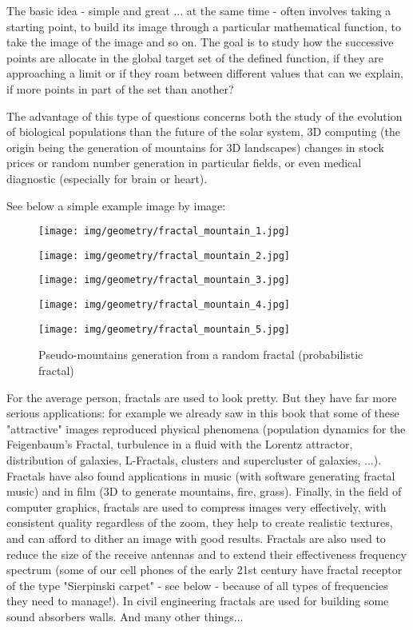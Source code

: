 	The basic idea - simple and great ... at the same time - often involves taking a starting point, to build its image through a particular mathematical function, to take the image of the image and so on. The goal is to study how the successive points are allocate in the global target set of the defined function, if they are approaching a limit or if they roam between different values that can we explain, if more points in part of the set than another?
	
	The advantage of this type of questions concerns both the study of the evolution of biological populations than the future of the solar system, 3D computing (the origin being the generation of mountains for 3D landscapes) changes in stock prices or random number generation in particular fields, or even medical diagnostic (especially for brain or heart).
	
	See below a simple example image by image:
	\begin{figure}[H]
		\centering
		\texttt{[image: img/geometry/fractal\_mountain\_1.jpg]}
	\end{figure}
	\begin{figure}[H]
		\centering
		\texttt{[image: img/geometry/fractal\_mountain\_2.jpg]}
	\end{figure}
	\begin{figure}[H]
		\centering
		\texttt{[image: img/geometry/fractal\_mountain\_3.jpg]}
	\end{figure}
	\begin{figure}[H]
		\centering
		\texttt{[image: img/geometry/fractal\_mountain\_4.jpg]}
	\end{figure}
	\begin{figure}[H]
		\centering
		\texttt{[image: img/geometry/fractal\_mountain\_5.jpg]}
		\caption{Pseudo-mountains generation from a random fractal (probabilistic fractal)}
	\end{figure}
	For the average person, fractals are used to look pretty. But they have far more serious applications: for example we already saw in this book that some of these "attractive" images reproduced physical phenomena (population dynamics for the Feigenbaum's Fractal, turbulence in a fluid with the Lorentz attractor, distribution of galaxies, L-Fractals, clusters and supercluster of galaxies, ...). Fractals have also found applications in music (with software generating fractal music) and in film (3D to generate mountains, fire, grass). Finally, in the field of computer graphics, fractals are used to compress images very effectively, with consistent quality regardless of the zoom, they help to create realistic textures, and can afford to dither an image with good results. Fractals are also used to reduce the size of the receive antennas and to extend their effectiveness frequency spectrum (some of our cell phones of the early 21st century have fractal receptor of the type "Sierpinski carpet" - see below - because of all types of frequencies they need to manage!). In civil engineering fractals are used for building some sound absorbers walls. And many other things...
	

